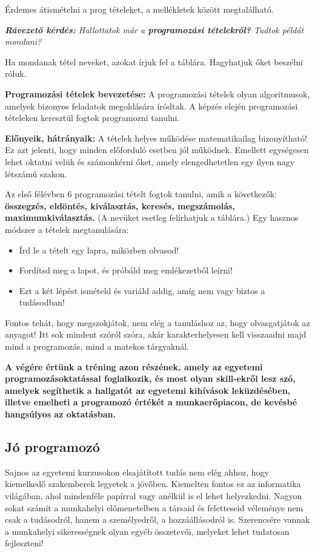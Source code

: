 \documentclass[../Main.tex]{subfiles}
\begin{document}
Érdemes átismételni a prog tételeket, a mellékletek között megtalálható.

\textit{\textbf{Rávezető kérdés:}
Hallottatok már a \textbf{programozási tételekről?}
Tudtok példát mondani?
}

Ha mondanak tétel neveket, azokat írjuk fel a táblára.
Hagyhatjuk őket beszélni róluk.

\textbf{Programozási tételek bevezetése:}
A programozási tételek olyan algoritmusok, amelyek bizonyos feladatok megoldására íródtak.
A képzés elején programozási tételeken keresztül fogtok programozni tanulni.

\textbf{Előnyeik, hátrányaik:}
A tételek helyes működése matematikailag bizonyítható!
Ez azt jelenti, hogy minden előforduló esetben jól működnek.
Emellett egységesen lehet oktatni velük és számonkérni őket, amely elengedhetetlen egy ilyen nagy létszámú szakon.

Az első félévben 6 programozási tételt fogtok tanulni, amik a következők:
\textbf{összegzés, eldöntés, kiválasztás, keresés, megszámolás, maximumkiválasztás.}
(A nevüket esetleg felírhatjuk a táblára.)
Egy hasznos módszer a tételek megtanulására:
\begin{itemize}
    \item Írd le a tételt egy lapra, miközben olvasod!
    \item Fordítsd meg a lapot, és próbáld meg emlékezetből leírni!
    \item Ezt a két lépést ismételd és variáld addig, amíg nem vagy biztos a tudásodban!
\end{itemize}

Fontos tehát, hogy megszokjátok, nem elég a tanuláshoz az, hogy olvasgatjátok az anyagot! Itt sok mindent szóról szóra, akár karakterhelyesen kell visszaadni majd mind a programozás, mind a matekos tárgyaknál.

\textbf{A végére értünk a tréning azon részének, amely az egyetemi programozásoktatással foglalkozik, és most olyan skill-ekről lesz szó, amelyek segíthetik a hallgatót az egyetemi kihívások leküzdésében, illetve emelheti a programozó értékét a munkaerőpiacon, de kevésbé hangsúlyos az oktatásban.}

\subsection{Jó programozó}

Sajnos az egyetemi kurzusokon elsajátított tudás nem elég ahhoz, hogy kiemelkedő szakemberek legyetek a jövőben.
Kiemelten fontos ez az informatika világában, ahol mindenféle papírral vagy anélkül is el lehet helyezkedni.
Nagyon sokat számít a munkahelyi előmenetelben a társaid és feletteseid véleménye nem csak a tudásodról, hanem a személyedről, a hozzáállásodról is.
Szerencsére vannak a munkahelyi sikerességnek olyan egyéb összetevői, melyeket lehet tudatosan fejleszteni!
\end{document}
